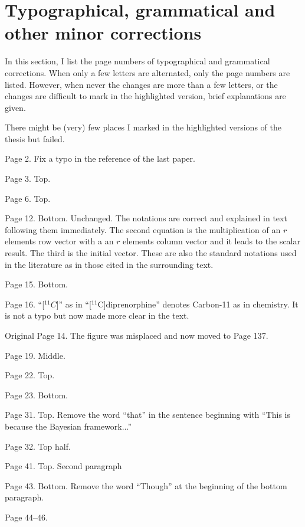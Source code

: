 \documentclass[11pt, fontset=Scala]{marticle}
\begin{document}


\section{Typographical, grammatical and other minor corrections} %
\label{sec:typographical_and_grammatical_corrections}

In this section, I list the page numbers of typographical and grammatical corrections. When only a few letters are alternated, only the page numbers are listed. However, when never the changes are more than a few letters, or the changes are difficult to mark in the highlighted version, brief explanations are given.

There might be (very) few places I marked in the highlighted versions of the thesis but failed.

Page 2. Fix a typo in the reference of the last paper.

Page 3. Top.

Page 6. Top.

Page 12. Bottom. Unchanged. The notations are correct and explained in text following them immediately. The second equation is the multiplication of an $r$ elements row vector with a an $r$ elements column vector and it leads to the scalar result. The third is the initial vector. These are also the standard notations used in the  literature as in those cited in the surrounding text.

Page 15. Bottom.

Page 16. ``[${}^{11}C$]'' as in ``[${}^{11}$C]diprenorphine'' denotes Carbon-11 as in chemistry. It is not a typo but now made more clear in the text.

Original Page 14. The figure was misplaced and now moved to Page 137.

Page 19. Middle.

Page 22. Top.

Page 23. Bottom.

Page 31. Top. Remove the word ``that'' in the sentence beginning with ``This is because the Bayesian framework...''

Page 32. Top half.

Page 41. Top. Second paragraph

Page 43. Bottom. Remove the word ``Though'' at the beginning of the bottom paragraph.

Page 44--46.
\end{document}
